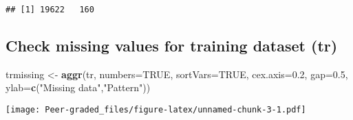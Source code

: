\documentclass[]{article}
\newenvironment{Shaded}{\begin{snugshade}}{\end{snugshade}}
\newcommand{\DataTypeTok}[1]{\textcolor[rgb]{0.13,0.29,0.53}{#1}}
\newcommand{\FloatTok}[1]{\textcolor[rgb]{0.00,0.00,0.81}{#1}}
\newcommand{\KeywordTok}[1]{\textcolor[rgb]{0.13,0.29,0.53}{\textbf{#1}}}
\newcommand{\NormalTok}[1]{#1}
\newcommand{\OtherTok}[1]{\textcolor[rgb]{0.56,0.35,0.01}{#1}}
\newcommand{\StringTok}[1]{\textcolor[rgb]{0.31,0.60,0.02}{#1}}
\begin{document}
\begin{verbatim}
## [1] 19622   160
\end{verbatim}

\hypertarget{check-missing-values-for-training-dataset-tr}{%
\subsection{Check missing values for training dataset
(tr)}\label{check-missing-values-for-training-dataset-tr}}

\begin{Shaded}
\begin{Highlighting}[]
\NormalTok{trmissing <-}\StringTok{ }\KeywordTok{aggr}\NormalTok{(tr, }\DataTypeTok{numbers=}\OtherTok{TRUE}\NormalTok{, }
              \DataTypeTok{sortVars=}\OtherTok{TRUE}\NormalTok{, }\DataTypeTok{cex.axis=}\FloatTok{0.2}\NormalTok{, }
              \DataTypeTok{gap=}\FloatTok{0.5}\NormalTok{, }\DataTypeTok{ylab=}\KeywordTok{c}\NormalTok{(}\StringTok{"Missing data"}\NormalTok{,}\StringTok{"Pattern"}\NormalTok{))}
\end{Highlighting}
\end{Shaded}

\texttt{[image: Peer-graded\_files/figure-latex/unnamed-chunk-3-1.pdf]}
\end{document}

